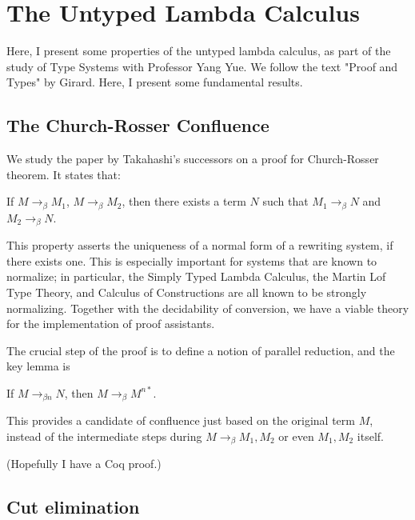 \chapter{The Untyped Lambda Calculus}

Here, I present some properties of the untyped lambda calculus, as part
of the study of Type Systems with Professor Yang Yue. We follow the text
"Proof and Types" by Girard. Here, I present some fundamental results.

\section{The Church-Rosser Confluence}

We study the paper by Takahashi's successors on a proof for Church-Rosser 
theorem. It states that:
\begin{theorem}
If $M\to_\beta M_1$, $M\to_\beta M_2$, then there exists a term $N$ such that
$M_1\to_\beta N$ and $M_2\to_\beta N$.
\end{theorem}

This property asserts the uniqueness of a normal form of a rewriting system, if
there exists one. This is especially important for systems that are known to
normalize; in particular, the Simply Typed Lambda Calculus, the Martin Lof Type
Theory, and Calculus of Constructions are all known to be strongly normalizing.
Together with the decidability of conversion, we have a viable theory for 
the implementation of proof assistants.

The crucial step of the proof is to define a notion of parallel reduction, and
the key lemma is

\begin{lemma}
If $M\to_{\beta n}N$, then $M\to_{\beta}M^{n*}$.
\end{lemma}

This provides a candidate of confluence just based on the original term $M$,
instead of the intermediate steps during $M\to_\beta M_1,M_2$ or even $M_1, M_2$
itself.

(Hopefully I have a Coq proof.)

\section{Cut elimination}